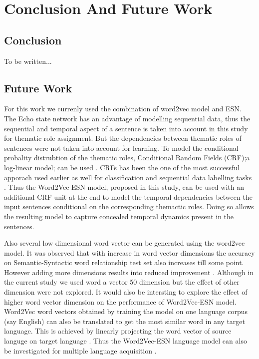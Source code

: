 \chapter{Conclusion And Future Work}\label{conclusion}


\section{Conclusion}

To be written...

\section{Future Work}

For this work we currenly used the combination of word2vec model and ESN. The Echo state network has an advantage of modelling sequential data, thus the sequential and temporal aspect of a sentence is taken into account in this study for thematic role assignment. But the dependencies between thematic roles of sentences were not taken into account for learning. To model the conditional probality distrubtion of the thematic roles, Conditional Random Fields (CRF);a log-linear model; can be used \cite{crf:intro:sutton}. CRFs has been the one of the most successful apporach used earlier as well for classification and sequential data labelling tasks \cite{end-to-end, esn:esn_crf}. Thus the Word2Vec-ESN model, proposed in this study, can be used with an additional CRF unit at the end to model the temporal dependencies between the input sentences conditional on the corresponding themactic roles. Doing so allows the resulting model to capture concealed temporal dynamics present in the sentences\cite{esn:esn_crf}. 

Also several low dimensional word vector can be generated using the word2vec model. It was observed that with increase in word vector dimensions the accuracy on Semantic-Syntactic word relationship test set \cite{w2v:regularities_in_word_representations}  also increases till some point. However adding more dimensions results into reduced improvement \cite{w2v:mikolov_2013_efficient}. Although in the current study we used word a vector 50 dimension but the effect of other dimension were not explored. It would also be intersting to explore the effect of higher word vector dimension on the performance of Word2Vec-ESN model. Word2Vec word vectors obtained by training the model on one language corpus (say English) can also be translated to get the most similar word in any target language. This is achieved by linearly projecting the word vector of source languge on target language \cite{w2v:language_similarities}. Thus the Word2Vec-ESN language model can also be investigated for multiple language acquisition \cite{hinaut_multiple_lang}. 